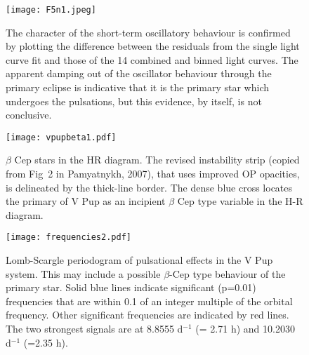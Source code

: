 \documentclass[useAMS,usenatbib]{mnras}                                                                           \usepackage[pdftex]{graphicx}
\begin{document}
 \begin{figure}
\label{fig-5}
\texttt{[image: F5n1.jpeg]}
\caption{The character of the short-term oscillatory behaviour is confirmed by
plotting the difference between the residuals from the single light curve fit and 
those of the 14 combined and binned light curves.  The apparent damping out
of the oscillator behaviour through the primary eclipse is indicative that it is
the primary star which undergoes the pulsations, but this evidence, by itself,
is not conclusive. }
\end{figure}
 
\begin{figure}
\label{fig-6}
\hspace{-3cm}
\texttt{[image: vpupbeta1.pdf]}
\vspace{-1cm}
\caption{$\beta$ Cep stars in the HR diagram.
The revised instability strip (copied from Fig~2 in Pamyatnykh, 2007),
that uses improved OP opacities, is delineated by the 
thick-line border.  The dense blue cross locates the primary of V Pup as an incipient
$\beta$ Cep type variable in the H-R diagram.}
\end{figure}

\begin{figure}
\label{fig-7}
\hspace{-0.5cm}
\texttt{[image: frequencies2.pdf]}
\caption{ Lomb-Scargle periodogram of pulsational effects in the V Pup system.
This may include a possible $\beta$-Cep type behaviour of the primary star. 
Solid blue lines indicate  significant (p=0.01) frequencies that are within 0.1 
of an integer multiple of the orbital frequency. Other significant 
frequencies are indicated by red lines.  
The two strongest signals are at 8.8555 d$^{-1}$ (= 2.71 h) and 10.2030 d$^{-1}$ (=2.35 h).
}
\end{figure}
\end{document}
